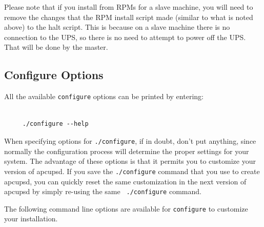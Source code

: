 Please note that if you install from RPMs for a slave machine, you will need
to remove the changes that the RPM install script made (similar to what is
noted above) to the halt script. This is because on a slave machine there is
no connection to the UPS, so there is no need to attempt to power off the UPS.
That will be done by the master. 

\label{Configure-Options}

\subsection*{Configure Options}

\label{index-configure-options-24}
\label{index-options_002c-configure-25}
All the available {\tt configure} options can be printed by entering: 

\footnotesize
\begin{verbatim}
     
     ./configure --help
\end{verbatim}
\normalsize

When specifying options for {\tt ./configure}, if in doubt, don't put
anything, since normally the configuration process will determine the proper
settings for your system. The advantage of these options is that it permits
you to customize your version of apcupsd.  If you save the {\tt ./configure}
command that you use to create apcupsd, you can quickly reset the same
customization in the next version of apcupsd by simply re-using the same {\tt
./configure} command.  

The following command line options are available for {\tt configure} to
customize your installation. 
\label{index-options_002c-_002d_002d_002dprefix-26}

